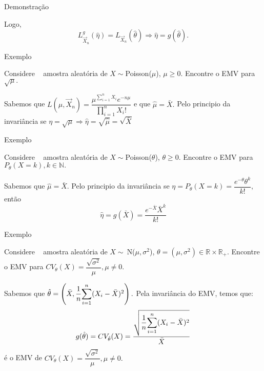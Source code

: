 \documentclass[12pt]{beamer}
\begin{document}
\begin{frame}{Demonstração}
	\begin{block}{}
		\justifying
		Logo, $$L_{\vec{X}_{n}}^{g}(\hat{\eta})=L_{\vec{X}_{n}}(\hat{\theta})\Rightarrow \hat{\eta}=g(\hat{\theta}).$$
	\end{block}
\end{frame}

\begin{frame}{Exemplo}
\begin{block}{}
\justifying
Considere \seqX~ amostra aleatória de $X\sim $Poisson($\mu$), $\mu\geq 0.$ Encontre o EMV para $\sqrt{\mu}.$
\end{block}
\pause
\begin{block}{}
	\justifying
	Sabemos que $L(\mu,\vec{X}_{n})=\dfrac{\mu^{{\displaystyle \sum_{i=1}^{n}X_{i}}}e^{-n\mu}}{{\displaystyle \prod_{i=1}^{n}X_{i}!}}$ e que $\hat{\mu}=\bar{X}.$ Pelo principio da invariância se $\eta=\sqrt{\mu}\Rightarrow \hat{\eta}=\sqrt{\hat{\mu}}=\sqrt{\bar{X}}$
\end{block}
\end{frame}

\begin{frame}{Exemplo}
	\begin{block}{}
		\justifying
		Considere \seqX~ amostra aleatória de $X\sim $Poisson($\theta$), $\theta\geq 0.$ Encontre o EMV para $P_{\theta}(X=k),k\in\mathbb{N}.$
	\end{block}
	\pause
	\begin{block}{}
		\justifying
		Sabemos que $\hat{\mu}=\bar{X}.$ Pelo principio da invariância se $\eta=P_{\theta}(X=k)=\dfrac{e^{-\theta}\theta^{k}}{k!},$ então $$\hat{\eta}=g(\bar{X})=\dfrac{e^{-\bar{X}}\bar{X}^{k}}{k!}$$
	\end{block}
\end{frame}

\begin{frame}{Exemplo}
	\begin{block}{}
		\justifying
		Considere \seqX~ amostra aleatória de $X\sim~$N($\mu,\sigma^{2}$), $\theta=(\mu,\sigma^{2})\in \mathbb{R}\times\mathbb{R}_{+}.$ Encontre o EMV para $CV_{\theta}(X)=\dfrac{\sqrt{\sigma^{2}}}{\mu},\mu\neq 0.$
	\end{block}
	\pause
	\begin{block}{}
		\justifying
		Sabemos que $\hat{\theta}=\left(\bar{X},\dfrac{1}{n}{\displaystyle \sum_{i=1}^{n}} (X_{i}-\bar{X})^{2}\right).$ Pela invariância do EMV, temos que:
		$$g(\hat{\theta})=CV_{\hat{\theta}}(X)=\dfrac{\sqrt{\dfrac{1}{n}{\displaystyle \sum_{i=1}^{n}} (X_{i}-\bar{X})^{2}}}{\bar{X}}$$ é o EMV de $CV_{\theta}(X)=\dfrac{\sqrt{\sigma^{2}}}{\mu},\mu\neq 0.$
	\end{block}
\end{frame}
\end{document}
